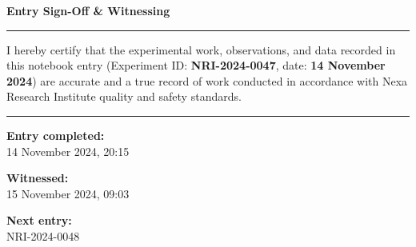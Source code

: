 
\vspace{8pt}

\begin{tcolorbox}[
  enhanced,
  colback=white,
  colframe=InkBlue,
  boxrule=0.8pt,
  arc=3pt,
  left=14pt, right=14pt,
  top=10pt, bottom=14pt,
  drop shadow={opacity=0.06, color=InkBlue},
]

  \begin{center}
    {\color{InkBlue}\small\textbf{\faPen\quad Entry Sign-Off \& Witnessing}}
  \end{center}
  \vspace{2pt}
  {\color{RuledLine}\rule{\linewidth}{0.5pt}}
  \vspace{8pt}

  {\small\color{Graphite}
    I hereby certify that the experimental work, observations, and data recorded in
    this notebook entry (Experiment ID: \textbf{NRI-2024-0047}, date:
    \textbf{14 November 2024}) are accurate and a true record of work conducted
    in accordance with Nexa Research Institute quality and safety standards.
  }

  \vspace{14pt}

  \noindent
  \hfill

  \vspace{14pt}

  {\color{RuledLine}\rule{\linewidth}{0.4pt}}
  \vspace{6pt}

  \noindent
  \begin{minipage}[t]{0.30\linewidth}
    {\footnotesize\color{Graphite}
      \textbf{Entry completed:}\\
      14 November 2024, 20:15
    }
  \end{minipage}%
  \hfill
  \begin{minipage}[t]{0.30\linewidth}
    \centering
    {\footnotesize\color{Graphite}
      \textbf{Witnessed:}\\
      15 November 2024, 09:03
    }
  \end{minipage}%
  \hfill
  \begin{minipage}[t]{0.30\linewidth}
    \raggedleft
    {\footnotesize\color{Graphite}
      \textbf{Next entry:}\\
      NRI-2024-0048
    }
  \end{minipage}


\end{tcolorbox}
